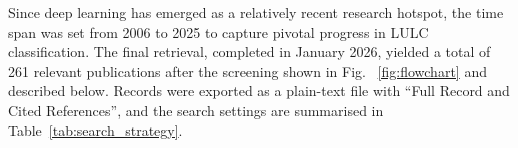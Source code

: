 \documentclass[]{interact}
\theoremstyle{plain}%
\theoremstyle{definition}
\theoremstyle{remark}
\DeclareRobustCommand{\DIFadd}[1]{{\protect\color{DIFaddcolor}\uwave{#1}}}
\DeclareRobustCommand{\DIFdel}[1]{{\protect\color{DIFdelcolor}\sout{#1}}}
\def\DIFadd#1{#1}%
\def\DIFdel#1{}%
\begin{document}
\DIFadd{Since} deep learning has emerged as a relatively recent research hotspot, the time span was set from 2006 to 2025 to capture pivotal progress in LULC \DIFdel{modeling}\DIFdel{.} \DIFdel{During} \DIFdel{the} \DIFdel{early} \DIFdel{21st} \DIFdel{century}\DIFdel{,} \DIFdel{major} \DIFdel{global} \DIFdel{environmental} \DIFdel{initiatives} \DIFdel{were} \DIFdel{dominated} \DIFdel{by} \DIFdel{traditional} \DIFdel{methodologies}\DIFdel{;} \DIFdel{however}\DIFdel{,} \DIFdel{the} \DIFdel{subsequent} \DIFdel{surge} \DIFdel{in} \DIFdel{deep} \DIFdel{learning} \DIFdel{has} \DIFdel{fundamentally} \DIFdel{reshaped} \DIFdel{the} \DIFdel{field's} \DIFdel{methodological} \DIFdel{landscape} \DIFadd{classification}. The final retrieval, completed in \DIFdel{December} \DIFdel{2025} \DIFadd{January} \DIFadd{2026}, yielded a total of 261 relevant publications \DIFadd{after} \DIFadd{the} \DIFadd{screening} \DIFadd{shown} \DIFadd{in} \DIFadd{Fig}. \DIFdel{The} \DIFdel{detailed} \DIFdel{classification}\DIFadd{~}{\color{blue}\ref{fig:flowchart} }and \DIFdel{statistics} \DIFdel{of} \DIFadd{described} \DIFadd{below}\DIFadd{.} \DIFadd{Records} \DIFadd{were} \DIFadd{exported} \DIFadd{as} \DIFadd{a} \DIFadd{plain-text} \DIFadd{file} \DIFadd{with} \DIFadd{`}\DIFadd{`}\DIFadd{Full} \DIFadd{Record} \DIFadd{and} \DIFadd{Cited} \DIFadd{References''}\DIFadd{,} \DIFadd{and} the search \DIFdel{results} \DIFadd{settings} are \DIFdel{summarized} \DIFadd{summarised} in Table~\ref{tab:search_strategy}.
\end{document}
